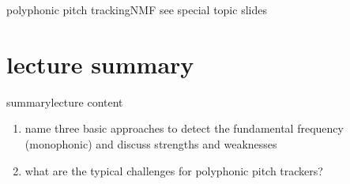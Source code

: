 	\begin{frame}{polyphonic pitch tracking}{NMF}
        see special topic slides
	\end{frame}
            
   \section[summary]{lecture summary}
        \begin{frame}{summary}{lecture content}
            \begin{enumerate}
                \item    name three basic approaches to detect the fundamental frequency (monophonic) and discuss strengths and weaknesses
                \smallskip
                \item<2->  what are the typical challenges for polyphonic pitch trackers?
            \end{enumerate}
        \end{frame}


